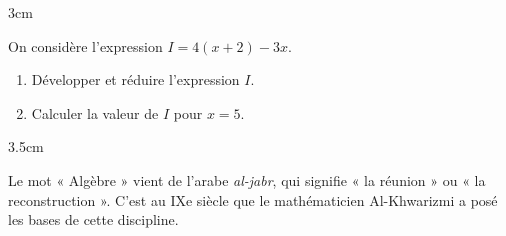 \documentclass[a4paper]{book}
\begin{document}
    \begin{ZoneReponse}{3cm}
    \end{ZoneReponse}
    
    \begin{exercice}
    On considère l'expression $I = 4(x + 2) - 3x$.
    \begin{enumerate}
        \item Développer et réduire l'expression $I$.
        \item Calculer la valeur de $I$ pour $x = 5$.
    \end{enumerate}
    \end{exercice}
    
    \begin{ZoneReponse}{3.5cm}
    \end{ZoneReponse}
    
    \begin{cultureMaths}
    Le mot « Algèbre » vient de l'arabe \textit{al-jabr}, qui signifie « la réunion » ou « la reconstruction ». C'est au IXe siècle que le mathématicien Al-Khwarizmi a posé les bases de cette discipline.
    \end{cultureMaths}
\end{document}

